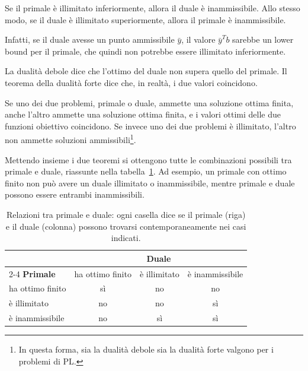 \begin{corollario}\label{cor:illimitato-inammissibile}
Se il primale è illimitato inferiormente, allora il duale è inammissibile. Allo stesso modo, se il duale è illimitato superiormente, allora il primale è inammissibile.
\end{corollario}

Infatti, se il duale avesse un punto ammissibile $\bar{y}$, il valore $\bar{y}^T b$ sarebbe un lower bound per il primale, che quindi non potrebbe essere illimitato inferiormente.

La dualità debole dice che l'ottimo del duale non supera quello del primale. Il teorema della dualità forte dice che, in realtà, i due valori coincidono.

\begin{teorema}\label{teo:dualita-forte}
Se uno dei due problemi, primale o duale, ammette una soluzione ottima finita, anche l'altro ammette una soluzione ottima finita, e i valori ottimi delle due funzioni obiettivo coincidono. Se invece uno dei due problemi è illimitato, l'altro non ammette soluzioni ammissibili\footnote{In questa forma, sia la dualità debole sia la dualità forte valgono per i problemi di PL.}.
\end{teorema}

Mettendo insieme i due teoremi si ottengono tutte le combinazioni possibili tra primale e duale, riassunte nella tabella~\ref{tab:primale-duale}. Ad esempio, un primale con ottimo finito non può avere un duale illimitato o inammissibile, mentre primale e duale possono essere entrambi inammissibili.

\begin{table}[htbp]
\centering
\begin{tabular}{lccc}
\toprule
 & \multicolumn{3}{c}{\textbf{Duale}} \\
\cmidrule(lr){2-4}
\textbf{Primale} & ha ottimo finito & è illimitato & è inammissibile \\
\midrule
ha ottimo finito & sì & no & no \\
è illimitato & no & no & sì \\
è inammissibile & no & sì & sì \\
\bottomrule
\end{tabular}
\caption{Relazioni tra primale e duale: ogni casella dice se il primale (riga) e il duale (colonna) possono trovarsi contemporaneamente nei casi indicati.}
\label{tab:primale-duale}
\end{table}

